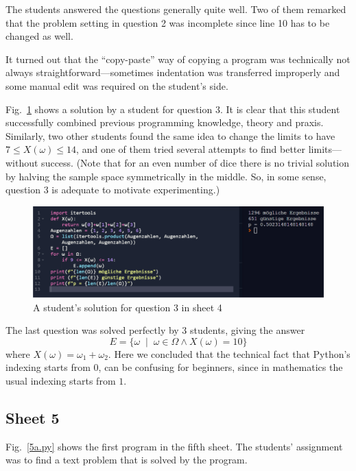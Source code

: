 \documentclass[]{interact}
\theoremstyle{plain}%
\theoremstyle{definition}
\theoremstyle{remark}
\begin{document}
The students answered the questions generally quite well. Two of them remarked that
the problem setting in question 2 was incomplete since line 10 has to be changed as well.

It turned out that the ``copy-paste'' way of copying a program was technically not always
straightforward---sometimes indentation was transferred improperly and some manual edit
was required on the student's side.

Fig.~\ref{42} shows a solution by a student for question 3. It is clear that this
student successfully combined previous programming knowledge, theory and praxis. Similarly,
two other students found the same idea to change the limits to have $7\leq X(\omega)\leq14$,
and one of them tried several attempts to find better limits---without success.
(Note that for an even number of dice there is no trivial solution by halving the
sample space symmetrically in the middle. So, in some sense, question 3 is adequate to motivate
experimenting.)

\begin{figure}
\begin{center}\includegraphics[width=1.0\textwidth]{42}
\caption{A student's solution for question 3 in sheet 4}
\label{42}
\end{center}
\end{figure}

The last question was solved perfectly by 3 students, giving the answer
$$E=\{\omega\;\mid\;\omega\in\Omega \land X(\omega)=10\}$$
where $X(\omega)=\omega_1+\omega_2$. Here we concluded that the technical
fact that Python's indexing starts from $0$, can be confusing for beginners,
since in mathematics the usual indexing starts from $1$.

\subsection*{Sheet 5}

Fig.~\ref{5a.py} shows the first program in the fifth sheet. The students' assignment was
to find a text problem that is solved by the program.
\end{document}
